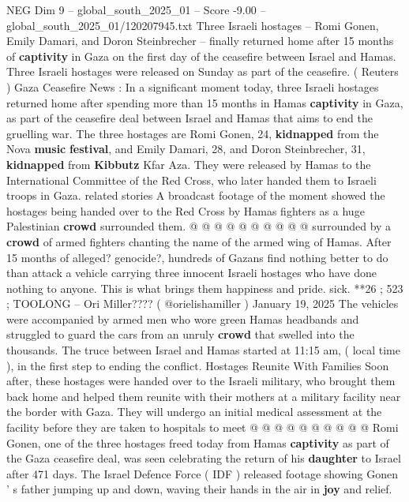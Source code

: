 \begin{textsample}{NEG Dim 9 – global\_south\_2025\_01 – Score -9.00 – global\_south\_2025\_01/120207945.txt}  \label{ex:f9_neg_132}
Three Israeli hostages -- Romi Gonen, Emily Damari, and Doron Steinbrecher -- finally returned home after 15 months of \textbf{captivity} in Gaza on the first day of the ceasefire between Israel and Hamas.
Three Israeli hostages were released on Sunday as part of the ceasefire. ( Reuters ) Gaza Ceasefire News : In a significant moment today, three Israeli hostages returned home after spending more than 15 months in Hamas \textbf{captivity} in Gaza, as part of the ceasefire deal between Israel and Hamas that aims to end the gruelling war.
The three hostages are Romi Gonen, 24, \textbf{kidnapped} from the Nova \textbf{music} \textbf{festival}, and Emily Damari, 28, and Doron Steinbrecher, 31, \textbf{kidnapped} from \textbf{Kibbutz} Kfar Aza.
They were released by Hamas to the International Committee of the Red Cross, who later handed them to Israeli troops in Gaza. related stories A broadcast footage of the moment showed the hostages being handed over to the Red Cross by Hamas fighters as a huge Palestinian \textbf{crowd} surrounded them. @ @ @ @ @ @ @ @ @ @ surrounded by a \textbf{crowd} of armed fighters chanting the name of the armed wing of Hamas.
After 15 months of alleged? genocide?, hundreds of Gazans find nothing better to do than attack a vehicle carrying three innocent Israeli hostages who have done nothing to anyone.
This is what brings them happiness and pride. sick. **26 ; 523 ; TOOLONG -- Ori Miller???? ( @orielishamiller ) January 19, 2025 The vehicles were accompanied by armed men who wore green Hamas headbands and struggled to guard the cars from an unruly \textbf{crowd} that swelled into the thousands.
The truce between Israel and Hamas started at 11:15 am, ( local time ), in the first step to ending the conflict.
Hostages Reunite With Families Soon after, these hostages were handed over to the Israeli military, who brought them back home and helped them reunite with their mothers at a military facility near the border with Gaza.
They will undergo an initial medical assessment at the facility before they are taken to hospitals to meet @ @ @ @ @ @ @ @ @ @ Romi Gonen, one of the three hostages freed today from Hamas \textbf{captivity} as part of the Gaza ceasefire deal, was seen celebrating the return of his \textbf{daughter} to Israel after 471 days.
The Israel Defence Force ( IDF ) released footage showing Gonen ' s father jumping up and down, waving their hands in the air in \textbf{joy} and relief.

\end{textsample}
